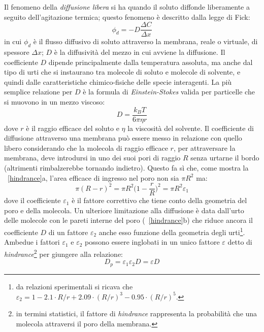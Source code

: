 Il fenomeno della \textit{diffusione libera} si ha quando il soluto diffonde liberamente a seguito dell'agitazione termica; questo fenomeno è descritto dalla legge di Fick:
\begin{equation}\label{fick1}
	\phi_d = - D \frac{\Delta C}{\Delta x}
\end{equation}
in cui $\phi_d $ è il flusso diffusivo di soluto attraverso la membrana, reale o virtuale, di spessore $\Delta x$; $D$ è la diffusività del mezzo in cui avviene la diffusione. Il coefficiente $D$ dipende principalmente dalla temperatura assoluta, ma anche dal tipo di urti che si instaurano tra molecole di soluto e molecole di solvente, e quindi dalle caratteristiche chimico-fisiche delle specie interagenti. La più semplice relazione per $D$ è la formula di \textit{Einstein-Stokes} valida per particelle che si muovono in un mezzo viscoso:
$$D = \frac{k_B T}{6 \pi \eta r}$$
dove $r$ è il raggio efficace del soluto e $\eta$ la viscosità del solvente. Il coefficiente di diffusione attraverso una membrana può essere messo in relazione con quello libero considerando che la molecola di raggio efficace $r$, per attraversare la membrana, deve introdursi in uno dei suoi pori di raggio $R$ senza urtarne il bordo (altrimenti rimbalzerebbe tornando indietro). Questo fa sì che, come mostra la \figurename~\ref{hindrance}a, l'area efficace di ingresso nel poro non sia $\pi R^2$ ma:
$$\pi(R-r)^2 = \pi R^2\biggl(1-\frac{r}{R}\biggr)^2 = \pi R^2 \varepsilon_1$$
dove il coefficiente $\varepsilon_1$ è il fattore correttivo che tiene conto della geometria del poro e della molecola. Un ulteriore limitazione alla diffusione è data dall'urto delle molecole con le pareti interne del poro (\figurename~\ref{hindrance}b) che riduce ancora il coefficiente $D$ di un fattore $\varepsilon_2$ anche esso funzione della geometria degli urti\footnote{da relazioni sperimentali \cite{costantino} si ricava che $\varepsilon_2 = 1-2.1\cdot R/r + 2.09 \cdot (R/r)^3 - 0.95 \cdot (R/r)^5$.}. Ambedue i fattori $\varepsilon_1$ e $\varepsilon_2$ possono essere inglobati in un unico fattore $\varepsilon$ detto di \textit{hindrance}\footnote{in termini statistici, il fattore di \textit{hindrance} rappresenta la probabilità che una molecola attraversi il poro della membrana.} per giungere alla relazione:
$$D_p = \varepsilon_1 \varepsilon_2 D = \varepsilon D$$ 
